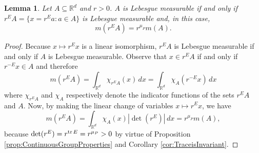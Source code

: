 \documentclass[11pt]{article}
\newtheorem{lemma}[theorem]{Lemma}
\theoremstyle{remark}
\renewcommand\det{\operatorname{det}}
\begin{document}
\begin{lemma}\label{lemma:Scaling}
Let $A\subseteq\mathbb{R}^d$ and $r>0$.  $A$ is Lebesgue measurable if and only if $r^E A=\{x=r^E a:a\in A\}$ is Lebesgue measurable and, in this case,
\begin{equation*}
m(r^E A)=r^{\mu_P}m(A).
\end{equation*}
\end{lemma}
\begin{proof}
Because $x\mapsto r^E x$ is a linear isomorphism, $r^E A$ is Lebesgue measurable if and only if $A$ is Lebesgue measurable. Observe that $x\in r^E A$ if and only if $r^{-E}x\in A$ and therefore
\begin{equation*}
m(r^E A)=\int_{\mathbb{R}^d}\chi_{r^E A}(x)\,dx=\int_{\mathbb{R}^d}\chi_{A}(r^{-E}x)\,dx
\end{equation*}
where $\chi_{r^EA}$ and $\chi_{A}$ respectively denote the indicator functions of the sets $r^EA$ and $A$. Now, by making the linear change of variables $x\mapsto r^E x$, we have
\begin{equation*}
m(r^E A)=\int_{\mathbb{R}^d}\chi_A(x)|\det(r^E)|\,dx=r^{\mu_P}m(A),
\end{equation*}
because $\det(r^E)=r^{\tr E}=r^{\mu_P}>0$ by virtue of Proposition \ref{prop:ContinuousGroupProperties} and Corollary \ref{cor:TraceisInvariant}.
\end{proof}
\end{document}
